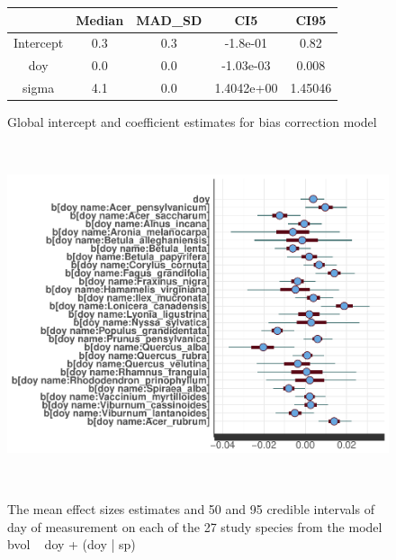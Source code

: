 \documentclass{article}\usepackage[]{graphicx}\usepackage[]{color}
\begin{document}
\begin{figure}
\begin{tabular}{c|c|c|c|c}
& Median& MAD_SD & CI5 & CI95\\
\hline
Intercept& 0.3 & 0.3 & -1.8e-01 & 0.82\\
\hline
doy &0.0 & 0.0 & -1.03e-03  &0.008 \\
\hline
sigma & 4.1 & 0.0 &1.4042e+00 & 1.45046 \\
\hline
\end{tabular}
\caption{Global intercept and coefficient estimates for bias correction model}
\end{figure}

\begin{figure}[h!]
\includegraphics[width=15cm, height=10cm]{shinstan_multiparam.pdf}\\
\caption{The mean effect sizes estimates and 50 and 95 credible intervals of day of measurement on each of the 27 study species from the model bvol ~ doy + (doy | sp)}
\end{figure}
\end{document}
